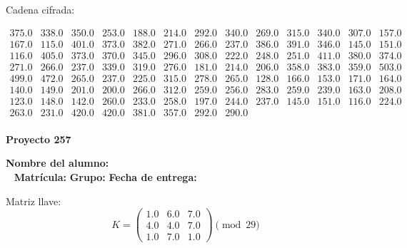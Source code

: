 \documentclass[12pt]{article}
\begin{document}
Cadena cifrada:
\begin{center}
$\begin{array}{lllllllllllll}
375.0 & 338.0 & 350.0 & 253.0 & 188.0 & 214.0 & 292.0 & 340.0 & 269.0 & 315.0 & 340.0 & 307.0 & 157.0\\
167.0 & 115.0 & 401.0 & 373.0 & 382.0 & 271.0 & 266.0 & 237.0 & 386.0 & 391.0 & 346.0 & 145.0 & 151.0\\
116.0 & 405.0 & 373.0 & 370.0 & 345.0 & 296.0 & 308.0 & 222.0 & 248.0 & 251.0 & 411.0 & 380.0 & 374.0\\
271.0 & 266.0 & 237.0 & 339.0 & 319.0 & 276.0 & 181.0 & 214.0 & 206.0 & 358.0 & 383.0 & 359.0 & 503.0\\
499.0 & 472.0 & 265.0 & 237.0 & 225.0 & 315.0 & 278.0 & 265.0 & 128.0 & 166.0 & 153.0 & 171.0 & 164.0\\
140.0 & 149.0 & 201.0 & 200.0 & 266.0 & 312.0 & 259.0 & 256.0 & 283.0 & 259.0 & 239.0 & 163.0 & 208.0\\
123.0 & 148.0 & 142.0 & 260.0 & 233.0 & 258.0 & 197.0 & 244.0 & 237.0 & 145.0 & 151.0 & 116.0 & 224.0\\
263.0 & 231.0 & 420.0 & 420.0 & 381.0 & 357.0 & 292.0 & 290.0\\
\end{array}$
\end{center}

\newpage


\textbf{Proyecto 257}

\textbf{Nombre del alumno:} \underline{\hspace{13cm}}\\\
\vspace{1cm}
\textbf{Matrícula:} \underline{\hspace{4cm}} \hspace{1cm}
\textbf{Grupo:} \underline{\hspace{2cm}}
\textbf{Fecha de entrega:} \underline{\hspace{2cm}}

\medskip

Matriz llave:
\[
K = \begin{pmatrix}
1.0 & 6.0 & 7.0\\
4.0 & 4.0 & 7.0\\
1.0 & 7.0 & 1.0
\end{pmatrix} \pmod{29}
\]
\end{document}
